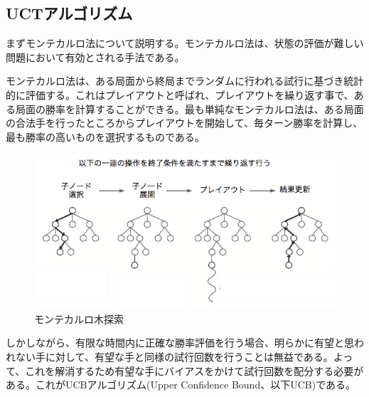 \documentclass[a4, 10pt,dvipdfmx]{jsarticle}
\begin{document}

\subsection{UCTアルゴリズム}

まずモンテカルロ法について説明する。モンテカルロ法は、状態の評価が難しい問題において有効とされる手法である。

モンテカルロ法は、ある局面から終局までランダムに行われる試行に基づき統計的に評価する。これはプレイアウトと呼ばれ、プレイアウトを繰り返す事で、ある局面の勝率を計算することができる。最も単純なモンテカルロ法は、ある局面の合法手を行ったところからプレイアウトを開始して、毎ターン勝率を計算し、最も勝率の高いものを選択するものである。

\begin{figure}[b]
    \begin{center}
      \includegraphics[width=120mm]{img/monte_carlo.png}
    \end{center}
    \caption{モンテカルロ木探索~\cite{kocsis2006bandit}}
    \label{monte_carlo}
\end{figure}

しかしながら、有限な時間内に正確な勝率評価を行う場合、明らかに有望と思われない手に対して、有望な手と同様の試行回数を行うことは無益である。よって、これを解消するため有望な手にバイアスをかけて試行回数を配分する必要がある。これがUCBアルゴリズム(Upper Confidence Bound、以下UCB)である。 
\end{document}
